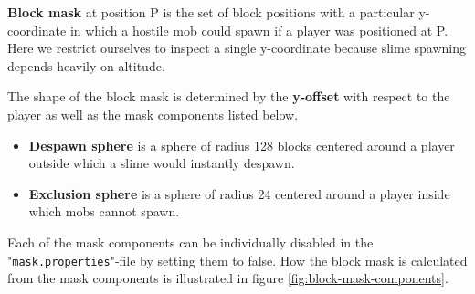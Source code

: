 \documentclass[12pt]{article}
\begin{document}
\textbf{Block mask} at position P is the set of block positions with a particular y-coordinate in which a hostile mob could spawn if a player was positioned at P. Here we restrict ourselves to inspect a single y-coordinate because slime spawning depends heavily on altitude. 

The shape of the block mask is determined by the \textbf{y-offset} with respect to the player as well as the mask components listed below.
\begin{itemize}[label={},leftmargin=1cm]
\item \textbf{Despawn sphere} is a sphere of radius 128 blocks centered around a player outside which a slime would instantly despawn.
\item \textbf{Exclusion sphere} is a sphere of radius 24 centered around a player inside which mobs cannot spawn.
\end{itemize}
Each of the mask components can be individually disabled in the "\texttt{mask.properties}"-file by setting them to false. How the block mask is calculated from the mask components is illustrated in figure \ref{fig:block-mask-components}.
\end{document}
